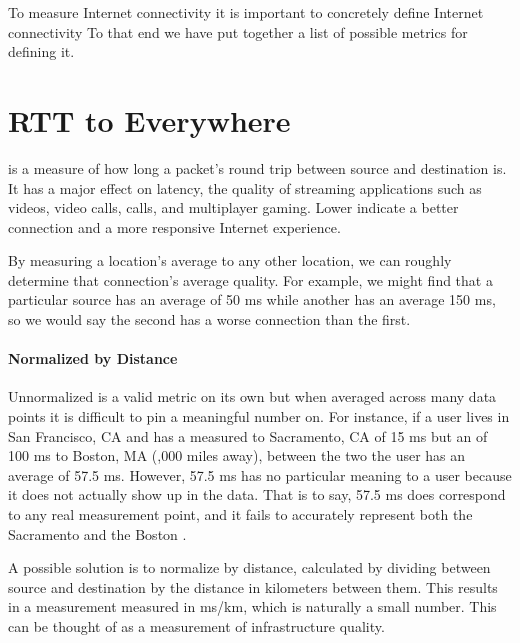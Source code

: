 To measure Internet connectivity it is important to concretely define Internet connectivity To that end we have put together a list of possible metrics for defining it.

\section{RTT to Everywhere}
\label{sec:definition_rtt_to_everywhere}

\RTT is a measure of how long a packet's round trip between source and destination is. It has a major effect on latency, the quality of streaming applications such as videos, video calls, \voip calls, and multiplayer gaming. Lower \rtts indicate a better connection and a more responsive Internet experience.

By measuring a location's average \rtt to any other location, we can roughly determine that connection's average quality. For example, we might find that a particular source has an average \rtt of 50 ms while another has an average 150 ms, so we would say the second has a worse connection than the first.

\paragraph{Normalized by Distance}
Unnormalized \rtt is a valid metric on its own but when averaged across many data points it is difficult to pin a meaningful number on. For instance, if a user lives in San Francisco, CA and has a measured \rtt to Sacramento, CA of 15 ms but an \rtt of 100 ms to Boston, MA (,000 miles away), between the two the user has an average \rtt of 57.5 ms. However, 57.5 ms has no particular meaning to a user because it does not actually show up in the data. That is to say, 57.5 ms does correspond to any real measurement point, and it fails to accurately represent both the Sacramento \rtt and the Boston \rtt.

A possible solution is to normalize \rtts by distance, calculated by dividing \rtt between source and destination by the distance in kilometers between them. This results in a measurement measured in ms/km, which is naturally a small number. This can be thought of as a measurement of infrastructure quality.

